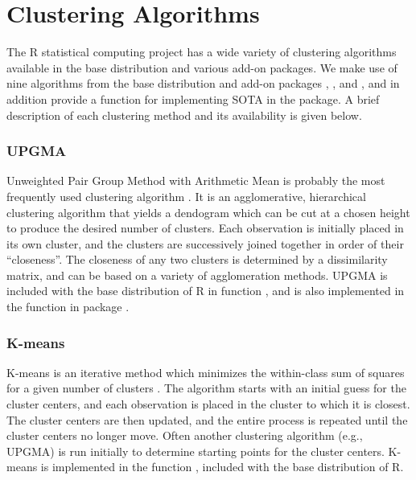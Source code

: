 \documentclass[11pt]{article}
\begin{document}





\section{Clustering Algorithms}
\label{sec:clustering}

The R statistical computing project \citep{R} has a wide variety of
clustering algorithms available in the base distribution and various
add-on packages.  We make use of nine algorithms from the base
distribution and add-on packages  \citep{cluster, Kau1990},  \citep{kohonen}, and
 \citep{mclust, Fra2003}, and in addition provide a function for implementing
SOTA in the  package.
A brief description of each clustering method and its availability is
given below.



\subsubsection*{UPGMA}

Unweighted Pair Group Method with Arithmetic Mean is probably the most
frequently used clustering algorithm \citep{Kau1990}.   It is an agglomerative,
hierarchical clustering algorithm that yields a dendogram which can
be cut at a chosen height to produce the desired number of clusters.
Each observation is initially placed in its own cluster, and the clusters are
successively joined together in order of their ``closeness''.  The
closeness of any two clusters is determined by a dissimilarity
matrix, and can be based on a variety of agglomeration methods.  
UPGMA is included with the base distribution of R in function
, and is also implemented in the 
function in package .


\subsubsection*{K-means}
K-means is an iterative method which minimizes the within-class sum of
squares for a given number of clusters \citep{Har1979}.  The algorithm starts with an
initial guess for the cluster centers, and each observation is placed
in the cluster to which it is closest.  The cluster centers are then
updated, and the entire process is repeated until the cluster centers
no longer move.  Often another clustering algorithm (e.g., UPGMA) is run initially to
determine starting points for the cluster centers.  K-means is
implemented in the function , included with the base
distribution of R.
  
\end{document}

